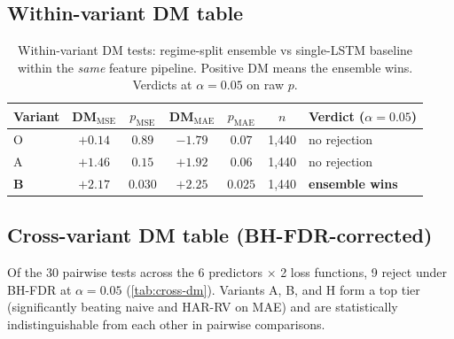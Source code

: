 \documentclass{article}
\begin{document}
\subsection{Within-variant DM table}
\label{app:within}

\begin{table}[H]
\centering
\caption{Within-variant DM tests: regime-split ensemble vs single-LSTM baseline within the \emph{same} feature pipeline. Positive DM means the ensemble wins. Verdicts at $\alpha = 0.05$ on raw $p$.}
\label{tab:within}
\small
\begin{tabular}{@{}lcccccl@{}}
\toprule
Variant & DM$_{\mathrm{MSE}}$ & $p_{\mathrm{MSE}}$ & DM$_{\mathrm{MAE}}$ & $p_{\mathrm{MAE}}$ & $n$ & Verdict ($\alpha=0.05$) \\
\midrule
O          & $+0.14$           & $0.89$            & $-1.79$           & $0.07$            & 1{,}440 & no rejection \\
A          & $+1.46$           & $0.15$            & $+1.92$           & $0.06$            & 1{,}440 & no rejection \\
\textbf{B} & $\mathbf{+2.17}$  & $\mathbf{0.030}$  & $\mathbf{+2.25}$  & $\mathbf{0.025}$  & 1{,}440 & \textbf{ensemble wins} \\
\bottomrule
\end{tabular}
\end{table}

\subsection{Cross-variant DM table (BH-FDR-corrected)}
\label{app:cross-dm}

Of the 30 pairwise tests across the 6 predictors $\times$ 2 loss functions, 9 reject under BH-FDR at $\alpha = 0.05$ (\cref{tab:cross-dm}). Variants A, B, and H form a top tier (significantly beating naive and HAR-RV on MAE) and are statistically indistinguishable from each other in pairwise comparisons.
\end{document}
